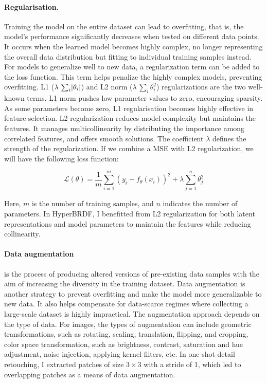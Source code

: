 \paragraph{Regularisation.} Training the model on the entire dataset can lead to overfitting, that is, the model's performance significantly decreases when tested on different data points. It occurs when the learned model becomes highly complex, no longer representing the overall data distribution but fitting to individual training samples instead. For models to generalize well to new data, a regularization term can be added to the loss function. This term helps penalize the highly complex models, preventing overfitting. L1 ($\lambda \, \sum_i \lvert\theta_i\rvert$) and L2 norm ($\lambda \, \sum_i \theta^2_i$) regularizations are the two well-known terms. L1 norm pushes low parameter values to zero, encouraging sparsity. As some parameters become zero, L1 regularisation becomes highly effective in feature selection. L2 regularization reduces model complexity but maintains the features. It manages multicollinearity by distributing the importance among correlated features, and offers smooth solutions. The coefficient $\lambda$ defines the strength of the regularization. If we combine a MSE with L2 regularization, we will have the following loss function:

\begin{equation}
\mathcal{L}(\theta) = \frac{1}{m} \sum_{i=1}^{m} (y_i - f_\theta(x_i))^2 + \lambda \sum_{j=1}^{n} \theta_j^2
\label{MSE-with-L2reg}
\end{equation}

Here, $m$ is the number of training samples, and $n$ indicates the number of parameters. In HyperBRDF, I benefitted from L2 regularization for both latent representations and model parameters to maintain the features while reducing collinearity.

\paragraph{Data augmentation} is the process of producing altered versions of pre-existing data samples with the aim of increasing the diversity in the training dataset. Data augmentation is another strategy to prevent overfitting and make the model more generalizable to new data. It also helps compensate for data-scarce regimes where collecting a large-scale dataset is highly impractical. The augmentation approach depends on the type of data. For images, the types of augmentation can include geometric transformations, such as rotating, scaling, translation, flipping, and cropping, color space transformation, such as brightness, contrast, saturation and hue adjustment, noise injection, applying kernel filters, etc. In one-shot detail retouching, I extracted patches of size $3 \times 3$ with a stride of 1, which led to overlapping patches as a means of data augmentation.

